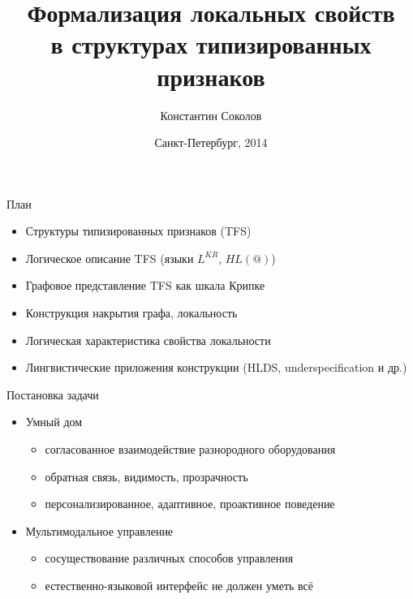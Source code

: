 \documentclass{beamer}
\begin{document}
\title{\Large{Формализация локальных свойств\\в структурах типизированных признаков}}
\author{Константин Соколов}
\date{Санкт-Петербург, 2014} 
\begin{frame}
    \thispagestyle{empty}
    \titlepage
\end{frame}

\begin{frame}{План}
    \setcounter{framenumber}{1}
    \begin{itemize}
        \item Структуры типизированных признаков (TFS)
        \item Логическое описание TFS (языки $L^{KR}$, $HL(@)$)
        \item Графовое представление TFS как шкала Крипке
        \item Конструкция накрытия графа, локальность
        \item Логическая характеристика свойства локальности
        \item Лингвистические приложения конструкции (HLDS, underspecification и др.)
    \end{itemize}
\end{frame}


\begin{frame}{}
\end{frame}

\begin{frame}{Постановка задачи}
\begin{itemize}
  \item Умный дом
	\begin{itemize}
  		\item согласованное взаимодействие разнородного оборудования
		\item обратная связь, видимость, прозрачность
		\item персонализированное, адаптивное, проактивное поведение
	\end{itemize}
  \bigskip
  \item Мультимодальное управление
	\begin{itemize}
  		\item сосуществование различных способов управления
		\item естественно-языковой интерфейс не должен уметь всё
	\end{itemize}
\end{itemize}
\end{frame}
\end{document}
